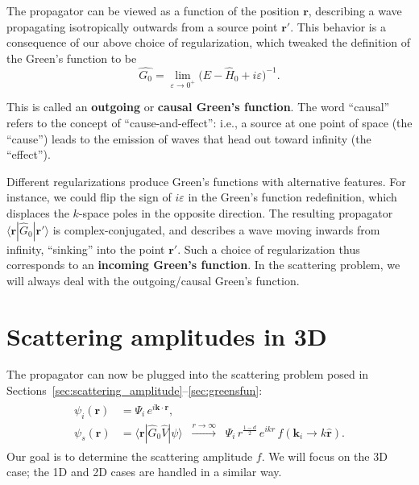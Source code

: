 \documentclass[pra,12pt]{revtex4}
\begin{document}
The propagator can be viewed as a function of the position
$\mathbf{r}$, describing a wave propagating isotropically outwards
from a source point $\mathbf{r}'$.  This behavior is a consequence of
our above choice of regularization, which tweaked the definition of
the Green's function to be
$$\boxed{\quad\hat{G_0} = \lim_{\varepsilon\rightarrow 0^+} \big(E - \hat{H}_0 + i \varepsilon\big)^{-1}.\quad}$$

This is called an \textbf{outgoing} or \textbf{causal Green's
  function}.  The word ``causal'' refers to the concept of
``cause-and-effect'': i.e., a source at one point of space (the
``cause'') leads to the emission of waves that head out toward
infinity (the ``effect'').

Different regularizations produce Green's functions with alternative
features.  For instance, we could flip the sign of $i\varepsilon$ in
the Green's function redefinition, which displaces the $k$-space poles
in the opposite direction.  The resulting propagator
$\langle\mathbf{r}|\hat{G}_0|\mathbf{r}'\rangle$ is
complex-conjugated, and describes a wave moving inwards from infinity,
``sinking'' into the point $\mathbf{r}'$.  Such a choice of
regularization thus corresponds to an \textbf{incoming Green's
  function}.  In the scattering problem, we will always deal with the
outgoing/causal Green's function.

\section{Scattering amplitudes in 3D}
\label{sec:3damp}

The propagator can now be plugged into the scattering problem
posed in Sections~\ref{sec:scattering_amplitude}--\ref{sec:greensfun}:
\begin{align}
  \begin{aligned} \psi_i(\mathbf{r}) &= \Psi_i \, e^{i\mathbf{k}\cdot\mathbf{r}}, \\ \psi_s(\mathbf{r}) &= \langle\mathbf{r}| \hat{G}_0 \hat{V} |\psi\rangle \;\; \overset{r\rightarrow\infty}{\longrightarrow}\;\; \Psi_i \, r^{\frac{1-d}{2}} \, e^{ikr} \, f(\mathbf{k}_i\rightarrow k\hat{\mathbf{r}}).
  \end{aligned}
\end{align}
Our goal is to determine the scattering amplitude $f$.  We will focus
on the 3D case; the 1D and 2D cases are handled in a similar way.
\end{document}
